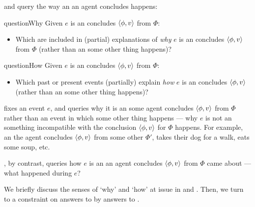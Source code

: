 \begin{note}
  \qWhy{} and \qHow{} query the way an  an agent concludes happens:

  \begin{question}{questionWhy}{\qWhy{}}
    Given \(e\) is an  \vAgent{} concludes \(\langle\phi, v\rangle\) from \(\Phi\):
    \begin{itemize}
    \item
      Which  are included in (partial) explanations of \emph{why} \(e\) is an  \vAgent{} concludes \(\langle\phi, v\rangle\) from \(\Phi\) (rather than an  some other thing happens)?
    \end{itemize}
    \vspace{-1\baselineskip}
  \end{question}

  \begin{question}{questionHow}{\qHow{}}
    Given \(e\) is an  \vAgent{} concludes \(\langle\phi, v\rangle\) from \(\Phi\):
    \begin{itemize}
    \item
      Which past or present events (partially) explain \emph{how} \(e\) is an  \vAgent{} concludes \(\langle\phi, v\rangle\) (rather than an  some other thing happens)?
    \end{itemize}
    \vspace{-1.5\baselineskip}
  \end{question}
\end{note}


\begin{note}
  \qWhy{} fixes an event \(e\), and queries why it is an  some agent concludes \(\langle\phi, v\rangle\) from \(\Phi\) rather than an event in which some other thing happens --- why \(e\) is not an  something incompatible with the conclusion \(\langle\phi, v\rangle\) for \(\Phi\) happens.
  For example, an  the agent concludes \(\langle\phi, v\rangle\) from some other \pool{} \(\Phi'\), takes their dog for a walk, eats some soup, etc.

  \qHow{}, by contrast, queries how \(e\) is an  an agent concludes \(\langle\phi, v\rangle\) from \(\Phi\) came about --- what happened during \(e\)?
\end{note}

\begin{note}
  We briefly discuss the senses of `why' and `how' at issue in \qWhy{} and \qHow{}.
  Then, we turn to a constraint on answers to \qWhy{} by answers to \qHow{}.
\end{note}


